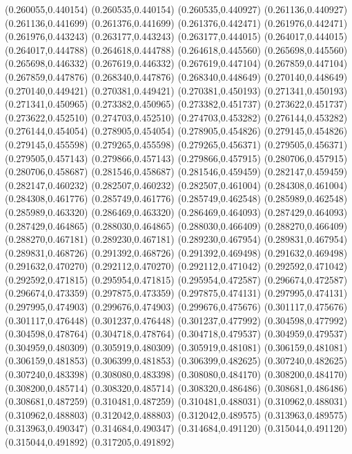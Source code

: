 (0.260055,0.440154)
(0.260535,0.440154)
(0.260535,0.440927)
(0.261136,0.440927)
(0.261136,0.441699)
(0.261376,0.441699)
(0.261376,0.442471)
(0.261976,0.442471)
(0.261976,0.443243)
(0.263177,0.443243)
(0.263177,0.444015)
(0.264017,0.444015)
(0.264017,0.444788)
(0.264618,0.444788)
(0.264618,0.445560)
(0.265698,0.445560)
(0.265698,0.446332)
(0.267619,0.446332)
(0.267619,0.447104)
(0.267859,0.447104)
(0.267859,0.447876)
(0.268340,0.447876)
(0.268340,0.448649)
(0.270140,0.448649)
(0.270140,0.449421)
(0.270381,0.449421)
(0.270381,0.450193)
(0.271341,0.450193)
(0.271341,0.450965)
(0.273382,0.450965)
(0.273382,0.451737)
(0.273622,0.451737)
(0.273622,0.452510)
(0.274703,0.452510)
(0.274703,0.453282)
(0.276144,0.453282)
(0.276144,0.454054)
(0.278905,0.454054)
(0.278905,0.454826)
(0.279145,0.454826)
(0.279145,0.455598)
(0.279265,0.455598)
(0.279265,0.456371)
(0.279505,0.456371)
(0.279505,0.457143)
(0.279866,0.457143)
(0.279866,0.457915)
(0.280706,0.457915)
(0.280706,0.458687)
(0.281546,0.458687)
(0.281546,0.459459)
(0.282147,0.459459)
(0.282147,0.460232)
(0.282507,0.460232)
(0.282507,0.461004)
(0.284308,0.461004)
(0.284308,0.461776)
(0.285749,0.461776)
(0.285749,0.462548)
(0.285989,0.462548)
(0.285989,0.463320)
(0.286469,0.463320)
(0.286469,0.464093)
(0.287429,0.464093)
(0.287429,0.464865)
(0.288030,0.464865)
(0.288030,0.466409)
(0.288270,0.466409)
(0.288270,0.467181)
(0.289230,0.467181)
(0.289230,0.467954)
(0.289831,0.467954)
(0.289831,0.468726)
(0.291392,0.468726)
(0.291392,0.469498)
(0.291632,0.469498)
(0.291632,0.470270)
(0.292112,0.470270)
(0.292112,0.471042)
(0.292592,0.471042)
(0.292592,0.471815)
(0.295954,0.471815)
(0.295954,0.472587)
(0.296674,0.472587)
(0.296674,0.473359)
(0.297875,0.473359)
(0.297875,0.474131)
(0.297995,0.474131)
(0.297995,0.474903)
(0.299676,0.474903)
(0.299676,0.475676)
(0.301117,0.475676)
(0.301117,0.476448)
(0.301237,0.476448)
(0.301237,0.477992)
(0.304598,0.477992)
(0.304598,0.478764)
(0.304718,0.478764)
(0.304718,0.479537)
(0.304959,0.479537)
(0.304959,0.480309)
(0.305919,0.480309)
(0.305919,0.481081)
(0.306159,0.481081)
(0.306159,0.481853)
(0.306399,0.481853)
(0.306399,0.482625)
(0.307240,0.482625)
(0.307240,0.483398)
(0.308080,0.483398)
(0.308080,0.484170)
(0.308200,0.484170)
(0.308200,0.485714)
(0.308320,0.485714)
(0.308320,0.486486)
(0.308681,0.486486)
(0.308681,0.487259)
(0.310481,0.487259)
(0.310481,0.488031)
(0.310962,0.488031)
(0.310962,0.488803)
(0.312042,0.488803)
(0.312042,0.489575)
(0.313963,0.489575)
(0.313963,0.490347)
(0.314684,0.490347)
(0.314684,0.491120)
(0.315044,0.491120)
(0.315044,0.491892)
(0.317205,0.491892)
